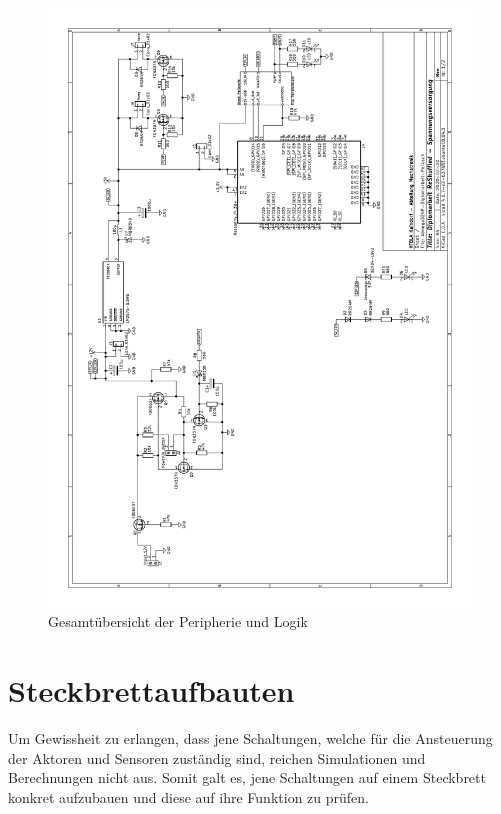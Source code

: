 \begin{figure}
    \includegraphics[scale=0.85,page=2]{fig/elektro/Schaltplan.pdf}
    \caption{Gesamtübersicht der Peripherie und Logik}
\end{figure}


\newpage
\section{Steckbrettaufbauten}

Um Gewissheit zu erlangen, dass jene Schaltungen, welche für die Ansteuerung der Aktoren und Sensoren zuständig sind, reichen Simulationen und Berechnungen nicht aus.
Somit galt es, jene Schaltungen auf einem Steckbrett konkret aufzubauen und diese auf ihre Funktion zu prüfen. \\

